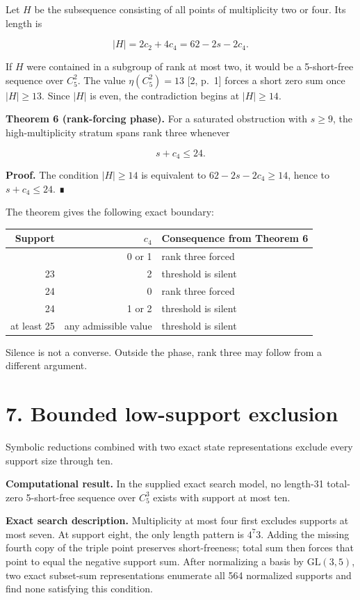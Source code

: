 \documentclass[
  11pt,
]{article}
\begin{document}
Let \(H\) be the subsequence consisting of all points of multiplicity
two or four. Its length is

\[
|H|=2c_2+4c_4=62-2s-2c_4.
\]

If \(H\) were contained in a subgroup of rank at most two, it would be a
5-short-free sequence over \(C_5^2\). The value \(\eta(C_5^2)=13\) {[}2,
p.~1{]} forces a short zero sum once \(|H|\ge13\). Since \(|H|\) is
even, the contradiction begins at \(|H|\ge14\).

\textbf{Theorem 6 (rank-forcing phase).} For a saturated obstruction
with \(s\ge9\), the high-multiplicity stratum spans rank three whenever

\[
s+c_4\le24.
\]

\textbf{Proof.} The condition \(|H|\ge14\) is equivalent to
\(62-2s-2c_4\ge14\), hence to \(s+c_4\le24\). ∎

The theorem gives the following exact boundary:

\begin{longtable}[]{@{}rrl@{}}
\toprule\noalign{}
Support & \(c_4\) & Consequence from Theorem 6 \\
\midrule\noalign{}
\endhead
\bottomrule\noalign{}
\endlastfoot
23 & 0 or 1 & rank three forced \\
23 & 2 & threshold is silent \\
24 & 0 & rank three forced \\
24 & 1 or 2 & threshold is silent \\
at least 25 & any admissible value & threshold is silent \\
\end{longtable}

Silence is not a converse. Outside the phase, rank three may follow from
a different argument.

\hypertarget{bounded-low-support-exclusion}{%
\section{7. Bounded low-support
exclusion}\label{bounded-low-support-exclusion}}

Symbolic reductions combined with two exact state representations
exclude every support size through ten.

\textbf{Computational result.} In the supplied exact search model, no
length-31 total-zero 5-short-free sequence over \(C_5^3\) exists with
support at most ten.

\textbf{Exact search description.} Multiplicity at most four first
excludes supports at most seven. At support eight, the only length
pattern is \(4^7 3\). Adding the missing fourth copy of the triple point
preserves short-freeness; total sum then forces that point to equal the
negative support sum. After normalizing a basis by \(\mathrm{GL}(3,5)\),
two exact subset-sum representations enumerate all 564 normalized
supports and find none satisfying this condition.
\end{document}
